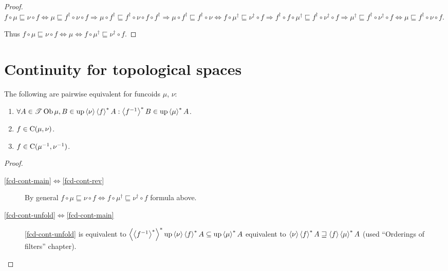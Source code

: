 \begin{proof}
$f \circ \mu \sqsubseteq \nu \circ f \Leftrightarrow \mu
\sqsubseteq f^{\dagger} \circ \nu \circ f \Rightarrow \mu \circ
f^{\dagger} \sqsubseteq f^{\dagger} \circ \nu \circ f \circ f^{\dagger}
\Rightarrow \mu \circ f^{\dagger} \sqsubseteq f^{\dagger} \circ \nu
\Leftrightarrow f \circ \mu^{\dagger} \sqsubseteq \nu^{\dagger} \circ f
\Rightarrow f^{\dagger} \circ f \circ \mu^{\dagger} \sqsubseteq
f^{\dagger} \circ \nu^{\dagger} \circ f \Rightarrow \mu^{\dagger}
\sqsubseteq f^{\dagger} \circ \nu^{\dagger} \circ f \Leftrightarrow \mu
\sqsubseteq f^{\dagger} \circ \nu \circ f$.

Thus $f \circ \mu \sqsubseteq \nu \circ f \Leftrightarrow \mu \Leftrightarrow
f \circ \mu^{\dagger} \sqsubseteq \nu^{\dagger} \circ f$.
\end{proof}

\section{Continuity for topological spaces}

\begin{prop}
  The following are pairwise equivalent for funcoids $\mu$, $\nu$:
  \begin{enumerate}
    \item\label{fcd-cont-unfold} $\forall A \in \mathscr{T} \operatorname{Ob} \mu, B \in \operatorname{up}
    \left\langle \nu\right\rangle \left\langle f\right\rangle ^{\ast} A : \left\langle f^{- 1}\right\rangle ^{\ast}
    B \in \operatorname{up} \left\langle \mu\right\rangle ^{\ast} A$.

    \item\label{fcd-cont-main}  $f \in \mathrm{C} (\mu, \nu)$.

    \item\label{fcd-cont-rev} $f \in \mathrm{C} (\mu^{- 1} , \nu^{- 1})$.
  \end{enumerate}
\end{prop}

\begin{proof}
  ~
  \begin{description}
  \item[\ref{fcd-cont-main}$\Leftrightarrow$\ref{fcd-cont-rev}] By general $f \circ \mu \sqsubseteq \nu \circ
  f \Leftrightarrow f \circ \mu^{\dagger} \sqsubseteq \nu^{\dagger}
  \circ f$ formula above.

  \item[\ref{fcd-cont-unfold}$\Leftrightarrow$\ref{fcd-cont-main}] \ref{fcd-cont-unfold} is equivalent to
  $\left\langle \left\langle f^{- 1}\right\rangle ^{\ast}\right\rangle ^{\ast}
  \operatorname{up} \left\langle \nu\right\rangle \left\langle f\right\rangle ^{\ast} A \subseteq \operatorname{up}
  \left\langle \mu\right\rangle ^{\ast} A$ equivalent to $\left\langle \nu\right\rangle \left\langle f\right\rangle ^{\ast}
  A \sqsupseteq \left\langle f\right\rangle \left\langle \mu\right\rangle ^{\ast} A$
  (used ``Orderings of filters'' chapter).
  \end{description}
\end{proof}

